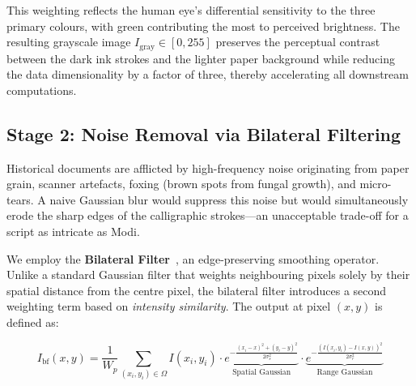 \documentclass[12pt, a4paper]{article}
\begin{document}
This weighting reflects the human eye's differential sensitivity to the three primary colours, with green contributing the most to perceived brightness. The resulting grayscale image $I_{\text{gray}} \in [0, 255]$ preserves the perceptual contrast between the dark ink strokes and the lighter paper background while reducing the data dimensionality by a factor of three, thereby accelerating all downstream computations.

\vspace{0.3em}
\noindent{}


\subsection{Stage 2: Noise Removal via Bilateral Filtering}

Historical documents are afflicted by high-frequency noise originating from paper grain, scanner artefacts, foxing (brown spots from fungal growth), and micro-tears. A naive Gaussian blur would suppress this noise but would simultaneously erode the sharp edges of the calligraphic strokes---an unacceptable trade-off for a script as intricate as Modi.

We employ the \textbf{Bilateral Filter}~\cite{tomasi1998}, an edge-preserving smoothing operator. Unlike a standard Gaussian filter that weights neighbouring pixels solely by their spatial distance from the centre pixel, the bilateral filter introduces a second weighting term based on \emph{intensity similarity}. The output at pixel $(x,y)$ is defined as:

\begin{equation}
    I_{\text{bf}}(x,y) = \frac{1}{W_p} \sum_{(x_i, y_i) \in \Omega} I(x_i, y_i) \cdot \underbrace{e^{-\frac{(x_i - x)^2 + (y_i - y)^2}{2\sigma_s^2}}}_{\text{Spatial Gaussian}} \cdot \underbrace{e^{-\frac{(I(x_i,y_i) - I(x,y))^2}{2\sigma_r^2}}}_{\text{Range Gaussian}}
    \label{eq:bilateral}
\end{equation}
\end{document}
